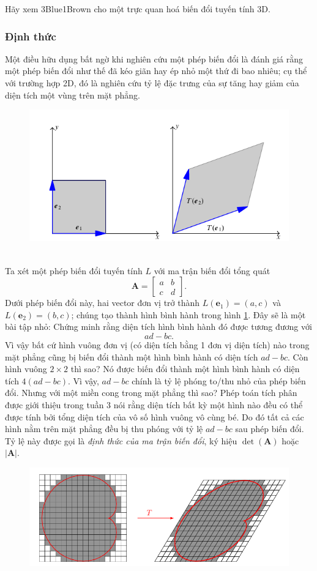 Hãy xem 3Blue1Brown cho một trực quan hoá biến đổi tuyến tính 3D.
\subsubsection*{Định thức}
Một điều hữu dụng bất ngờ khi nghiên cứu một phép biến đổi là đánh giá rằng một phép biến đổi như thế đã kéo giãn hay ép nhỏ một thứ đi bao nhiêu;
cụ thể với trường hợp 2D, đó là nghiên cứu tỷ lệ đặc trưng của sự tăng hay giảm của diện tích một vùng trên mặt phẳng. 
\begin{figure}[H]
    \centering
    \includegraphics[width=0.6\linewidth]{Tuan2/Figures/det1.png}\
    \caption{}
    \label{DT1}
\end{figure}
Ta xét một phép biến đổi tuyến tính \(L\) với ma trận biến đổi tổng quát
\[\mathbf{A}=\begin{bmatrix}
    a&b\\c&d
\end{bmatrix}.\] Dưới phép biến đổi này, hai vector đơn vị trở thành \(L(\mathbf{e}_1)=(a,c)\) và \(L(\mathbf{e}_2)=(b,c)\); chúng tạo thành hình bình hành trong hình \ref{DT1}. Đây sẽ là một bài tập nhỏ: Chứng minh rằng diện tích hình bình hành đó được tương đương với 
\[ad-bc.\] Vì vậy bất cứ hình vuông đơn vị (có diện tích bằng 1 đơn vị diện tích) nào trong mặt phẳng cũng bị biến đổi thành một hình bình hành có diện tích \(ad-bc\). Còn hình vuông \(2\times 2\) thì sao? Nó được biến đổi thành một hình bình hành có diện tích \(4(ad-bc)\).
Vì vậy, \(ad-bc\) chính là tỷ lệ phóng to/thu nhỏ của phép biến đổi. Nhưng với một miền cong trong mặt phẳng thì sao? Phép toán tích phân được giới thiệu trong tuần 3 nói rằng diện tích bất kỳ một hình nào đều có thể được tính bởi tổng diện tích của vô số hình vuông vô cùng bé. Do đó tất cả các hình nằm trên mặt phẳng
đều bị thu phóng với tỷ lệ \(ad-bc\) sau phép biến đổi. Tỷ lệ này được gọi là \emph{định thức của ma trận biến đổi}, ký hiệu \(\det(\mathbf{A})\) hoặc \(\lvert \mathbf{A}\rvert\).
\begin{figure}[H]
    \centering
    \includegraphics[width=0.6\linewidth]{Tuan2/Figures/det2.png}
\end{figure}
